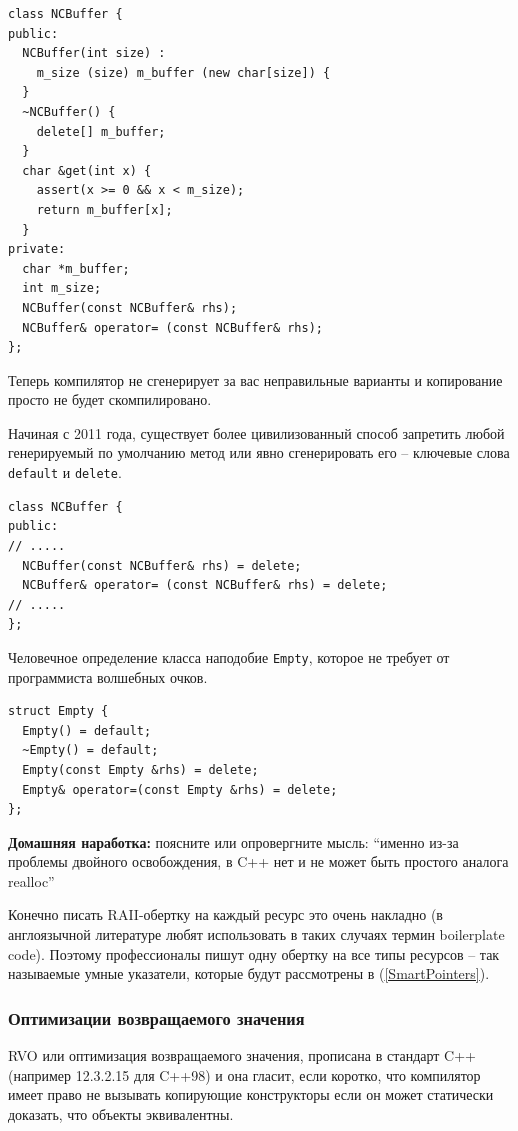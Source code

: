 \documentclass[a4paper,12pt,oneside]{article}
\begin{document}
\begin{lstlisting}
class NCBuffer {
public:
  NCBuffer(int size) : 
    m_size (size) m_buffer (new char[size]) {
  }
  ~NCBuffer() { 
    delete[] m_buffer; 
  }
  char &get(int x) { 
    assert(x >= 0 && x < m_size); 
    return m_buffer[x]; 
  }
private:
  char *m_buffer;
  int m_size;
  NCBuffer(const NCBuffer& rhs);
  NCBuffer& operator= (const NCBuffer& rhs);
};
\end{lstlisting}

Теперь компилятор не сгенерирует за вас неправильные варианты и копирование просто не будет скомпилировано.

Начиная с 2011 года, существует более цивилизованный способ запретить любой генерируемый по умолчанию метод или явно сгенерировать его -- ключевые слова \lstinline!default! и \lstinline!delete!.

\begin{lstlisting}
class NCBuffer {
public:
// .....
  NCBuffer(const NCBuffer& rhs) = delete;
  NCBuffer& operator= (const NCBuffer& rhs) = delete;
// .....
};
\end{lstlisting}

Человечное определение класса наподобие \lstinline!Empty!, которое не требует от программиста волшебных очков.

\begin{lstlisting}
struct Empty {
  Empty() = default;
  ~Empty() = default;
  Empty(const Empty &rhs) = delete;
  Empty& operator=(const Empty &rhs) = delete;
};
\end{lstlisting}

\textbf{Домашняя наработка:} поясните или опровергните мысль: ``именно из-за проблемы двойного освобождения, в C++ нет и не может быть простого аналога realloc''

Конечно писать RAII-обертку на каждый ресурс это очень накладно (в англоязычной литературе любят использовать в таких случаях термин boilerplate code). Поэтому профессионалы пишут одну обертку на все типы ресурсов -- так называемые умные указатели, которые будут рассмотрены в (\ref{SmartPointers}).

\subsubsection{Оптимизации возвращаемого значения}\label{RVO}

RVO или оптимизация возвращаемого значения, прописана в стандарт C++ (например 12.3.2.15 для C++98) и она гласит, если коротко, что компилятор имеет право не вызывать копирующие конструкторы если он может статически доказать, что объекты эквивалентны.
\end{document}
